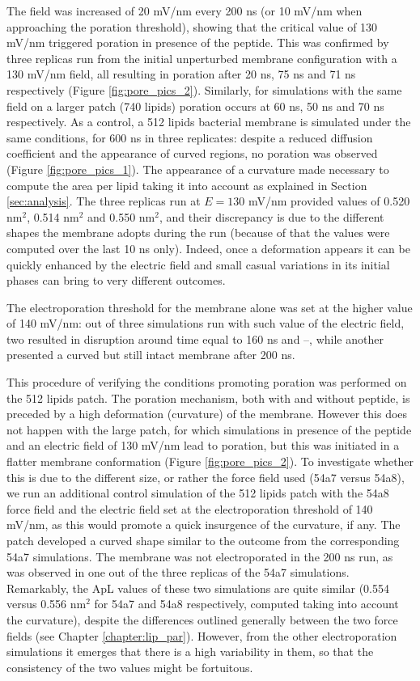 The field was increased of 20 mV/nm every 200 ns (or 10 mV/nm when approaching the poration threshold), showing that the critical value of 130 mV/nm triggered poration in presence of the peptide. This was confirmed by three replicas run from the initial unperturbed membrane configuration with a 130 mV/nm field, all resulting in poration after 20 ns, 75 ns and 71 ns respectively (Figure \ref{fig:pore_pics_2}).
%
Similarly, for simulations with the same field on a larger patch (740 lipids) poration occurs at 60 ns, 50 ns and 70 ns respectively.
%
As a control, a 512 lipids bacterial membrane is simulated under the same conditions, for 600 ns in three replicates: despite a reduced diffusion coefficient and the appearance of curved regions, no poration was observed (Figure \ref{fig:pore_pics_1}). The appearance of a curvature made necessary to compute the area per lipid taking it into account as explained in Section \ref{sec:analysis}. The three replicas run at $E=130$ mV/nm provided values of 0.520 nm$^2$, 0.514 nm$^2$ and 0.550 nm$^2$, and their discrepancy is due to the different shapes the membrane adopts during the run (because of that the values were computed over the last 10 ns only).
%
Indeed, once a deformation appears it can be quickly enhanced by the electric field and small casual variations in its initial phases can bring to very different outcomes.

The electroporation threshold for the membrane alone was set at the higher value of 140 mV/nm: out of three simulations run with such value of the electric field, two resulted in disruption around time equal to 160 ns and --, while another presented a curved but still intact membrane after 200 ns.

This procedure of verifying the conditions promoting poration was performed on the 512 lipids patch. The poration mechanism, both with and without peptide, is preceded by a high deformation (curvature) of the membrane. However this does not happen with the large patch, for which simulations in presence of the peptide and an electric field of 130 mV/nm lead to poration, but this was initiated in a flatter membrane conformation (Figure \ref{fig:pore_pics_2}).
%
To investigate whether this is due to the different size, or rather the force field used (54a7 versus 54a8), we run an additional control simulation of the 512 lipids patch with the 54a8 force field and the electric field set at the electroporation threshold of 140 mV/nm, as this would promote a quick insurgence of the curvature, if any. The patch developed a curved shape similar to the outcome from the corresponding 54a7 simulations. The membrane was not electroporated in the 200 ns run, as was observed in one out of the three replicas of the 54a7 simulations.
%
Remarkably, the ApL values of these two simulations are quite similar (0.554 versus 0.556 nm$^2$ for 54a7 and 54a8 respectively, computed taking into account the curvature), despite the differences outlined generally between the two force fields (see Chapter \ref{chapter:lip_par}). However, from the other electroporation simulations it emerges that there is a high variability in them, so that the consistency of the two values might be fortuitous.



